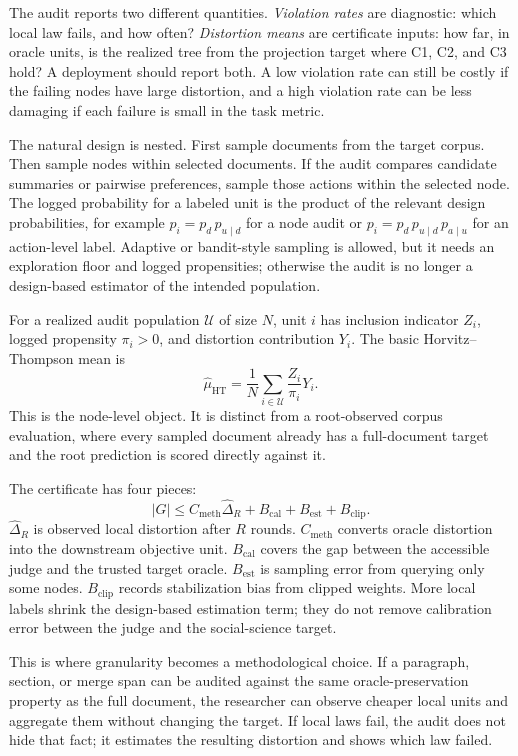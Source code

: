The audit reports two different quantities. \emph{Violation rates} are
diagnostic: which local law fails, and how often? \emph{Distortion means} are
certificate inputs: how far, in oracle units, is the realized tree from the
projection target where C1, C2, and C3 hold? A deployment should report both.
A low violation rate can still be costly if the failing nodes have large
distortion, and a high violation rate can be less damaging if each failure is
small in the task metric.

The natural design is nested. First sample documents from the target corpus.
Then sample nodes within selected documents. If the audit compares candidate
summaries or pairwise preferences, sample those actions within the selected
node. The logged probability for a labeled unit is the product of the relevant
design probabilities, for example
$p_i=p_d\,p_{u\mid d}$ for a node audit or
$p_i=p_d\,p_{u\mid d}\,p_{a\mid u}$ for an action-level label. Adaptive or
bandit-style sampling is allowed, but it needs an exploration floor and
logged propensities; otherwise the audit is no longer a design-based
estimator of the intended population.

For a realized audit population $\mathcal U$ of size $N$, unit $i$ has
inclusion indicator $Z_i$, logged propensity $\pi_i>0$, and distortion
contribution $Y_i$. The basic Horvitz--Thompson mean is
\[
  \hat\mu_{\mathrm{HT}}
  =
  \frac{1}{N}\sum_{i\in\mathcal U}\frac{Z_i}{\pi_i}Y_i.
\]
This is the node-level object. It is distinct from a root-observed corpus
evaluation, where every sampled document already has a full-document target
and the root prediction is scored directly against it.

The certificate has four pieces:
\[
  |G|
  \le
  C_{\mathrm{meth}}\hat{\Delta}_R
  + B_{\mathrm{cal}} + B_{\mathrm{est}} + B_{\mathrm{clip}}.
\]
$\hat{\Delta}_R$ is observed local distortion after $R$ rounds.
$C_{\mathrm{meth}}$ converts oracle distortion into the downstream objective
unit. $B_{\mathrm{cal}}$ covers the gap between the accessible judge and the
trusted target oracle. $B_{\mathrm{est}}$ is sampling error from querying only
some nodes. $B_{\mathrm{clip}}$ records stabilization bias from clipped
weights. More local labels shrink the design-based estimation term; they do
not remove calibration error between the judge and the social-science target.

This is where granularity becomes a methodological choice. If a paragraph,
section, or merge span can be audited against the same oracle-preservation
property as the full document, the researcher can observe cheaper local units
and aggregate them without changing the target. If local laws fail, the audit
does not hide that fact; it estimates the resulting distortion and shows
which law failed.

